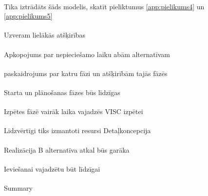 \paragraph{}
Tika iztrādāts šāds modelis, skatīt pieliktumus \ref{app:pielikums4} un \ref{app:pielikums5}
\paragraph{}
Uzveram lielākās atšķirības
\paragraph{}
Apkopojums par nepieciešamo laiku abām alternatīvam
\paragraph{}
paskaidrojums par katru fāzi un atšķirībām tajās fāzēs
\paragraph{}
Starta un plānošanas fāzes būs līdzīgas
\paragraph{}
Izpētes fāzē vairāk laika vajadzēs VISC izpētei
\paragraph{}
Līdzvērtīgi tiks izmantoti resursi Detaļkoncepcija
\paragraph{}
Realizācija B alternatīva atkal būs garāka
\paragraph{}
Ieviešanai vajadzētu būt līdzīgai
\paragraph{}
Summary
